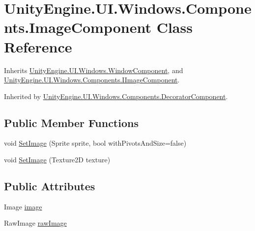 \hypertarget{class_unity_engine_1_1_u_i_1_1_windows_1_1_components_1_1_image_component}{}\section{Unity\+Engine.\+U\+I.\+Windows.\+Components.\+Image\+Component Class Reference}
\label{class_unity_engine_1_1_u_i_1_1_windows_1_1_components_1_1_image_component}


Inherits \hyperlink{class_unity_engine_1_1_u_i_1_1_windows_1_1_window_component}{Unity\+Engine.\+U\+I.\+Windows.\+Window\+Component}, and \hyperlink{interface_unity_engine_1_1_u_i_1_1_windows_1_1_components_1_1_i_image_component}{Unity\+Engine.\+U\+I.\+Windows.\+Components.\+I\+Image\+Component}.



Inherited by \hyperlink{class_unity_engine_1_1_u_i_1_1_windows_1_1_components_1_1_decorator_component}{Unity\+Engine.\+U\+I.\+Windows.\+Components.\+Decorator\+Component}.

\subsection*{Public Member Functions}
\begin{DoxyCompactItemize}
\item 
void \hyperlink{class_unity_engine_1_1_u_i_1_1_windows_1_1_components_1_1_image_component_acce3cb932dc2189fdc345b831ccdd74a}{Set\+Image} (Sprite sprite, bool with\+Pivots\+And\+Size=false)
\item 
void \hyperlink{class_unity_engine_1_1_u_i_1_1_windows_1_1_components_1_1_image_component_ac9ba975ed5a75bef1fbbd7ffdd20ea76}{Set\+Image} (Texture2\+D texture)
\end{DoxyCompactItemize}
\subsection*{Public Attributes}
\begin{DoxyCompactItemize}
\item 
Image \hyperlink{class_unity_engine_1_1_u_i_1_1_windows_1_1_components_1_1_image_component_a553fbd81fd78ad4a38efd54125160156}{image}
\item 
Raw\+Image \hyperlink{class_unity_engine_1_1_u_i_1_1_windows_1_1_components_1_1_image_component_a6671472654ac3b838678ede9761fc4f0}{raw\+Image}
\end{DoxyCompactItemize}


